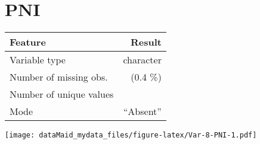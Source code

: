 \documentclass[]{report}
\begin{document}
\noindent\makebox[\linewidth]{\rule{\textwidth}{0.4pt}}

\hypertarget{pni}{%
\section{PNI}\label{pni}}

\begin{minipage}{0.75 \textwidth}

\begin{longtable}[]{@{}lr@{}}
\toprule
\begin{minipage}[b]{0.34\columnwidth}\raggedright
Feature\strut
\end{minipage} & \begin{minipage}[b]{0.16\columnwidth}\raggedleft
Result\strut
\end{minipage}\tabularnewline
\midrule
\endhead
\begin{minipage}[t]{0.34\columnwidth}\raggedright
Variable type\strut
\end{minipage} & \begin{minipage}[t]{0.16\columnwidth}\raggedleft
character\strut
\end{minipage}\tabularnewline
\begin{minipage}[t]{0.34\columnwidth}\raggedright
Number of missing obs.\strut
\end{minipage} & \begin{minipage}[t]{0.16\columnwidth}\raggedleft
1 (0.4 \%)\strut
\end{minipage}\tabularnewline
\begin{minipage}[t]{0.34\columnwidth}\raggedright
Number of unique values\strut
\end{minipage} & \begin{minipage}[t]{0.16\columnwidth}\raggedleft
2\strut
\end{minipage}\tabularnewline
\begin{minipage}[t]{0.34\columnwidth}\raggedright
Mode\strut
\end{minipage} & \begin{minipage}[t]{0.16\columnwidth}\raggedleft
``Absent''\strut
\end{minipage}\tabularnewline
\bottomrule
\end{longtable}

\end{minipage}
\begin{minipage}{0.25 \textwidth}

\texttt{[image: dataMaid\_mydata\_files/figure-latex/Var-8-PNI-1.pdf]}

\end{minipage}
\end{document}
